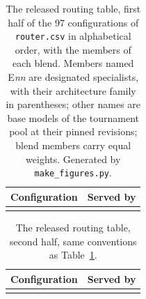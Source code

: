 \documentclass[11pt]{article}
\newcommand{\code}[1]{\texttt{#1}}
\begin{document}
\begin{table}[p]
\centering
\footnotesize
\setlength{\tabcolsep}{4pt}
\begin{tabular}{ll}
\toprule
Configuration & Served by \\
\midrule
 \\
\bottomrule
\end{tabular}
\caption{The released routing table, first half of the 97 configurations
of \code{router.csv} in alphabetical order, with the members of each
blend. Members named E\emph{nn} are designated specialists, with their
architecture family in parentheses; other names are base models of the
tournament pool at their pinned revisions; blend members carry equal
weights. Generated by \code{make\_figures.py}.}
\label{tab:router}
\end{table}

\begin{table}[p]
\centering
\footnotesize
\setlength{\tabcolsep}{4pt}
\begin{tabular}{ll}
\toprule
Configuration & Served by \\
\midrule
 \\
\bottomrule
\end{tabular}
\caption{The released routing table, second half, same conventions as
Table~\ref{tab:router}.}
\label{tab:routerb}
\end{table}
\end{document}
